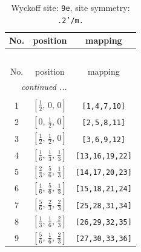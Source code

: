 \documentclass[fleqn,8pt]{jsarticle}
\begin{document}
\begin{longtable}{ccc}
\caption{Wyckoff site: {\tt 9e}, site symmetry: {\tt .2'/m.}}
 \\
 \hline \hline
No. & position & mapping \\ \hline \endfirsthead

\multicolumn{2}{l}{\tablename\ \thetable{}} \\
 \hline \hline
No. & position & mapping \\ \hline \endhead

 \hline \hline
\multicolumn{2}{r}{\footnotesize\it continued ...} \\ \endfoot

 \hline \hline
\multicolumn{2}{r}{} \\ \endlastfoot

1 & $\left[ \frac{1}{2},\, 0,\, 0 \right]$ & {\tt [1,4,7,10]} \\ \hline
2 & $\left[ 0,\, \frac{1}{2},\, 0 \right]$ & {\tt [2,5,8,11]} \\ \hline
3 & $\left[ \frac{1}{2},\, \frac{1}{2},\, 0 \right]$ & {\tt [3,6,9,12]} \\ \hline
4 & $\left[ \frac{1}{6},\, \frac{1}{3},\, \frac{1}{3} \right]$ & {\tt [13,16,19,22]} \\ \hline
5 & $\left[ \frac{2}{3},\, \frac{5}{6},\, \frac{1}{3} \right]$ & {\tt [14,17,20,23]} \\ \hline
6 & $\left[ \frac{1}{6},\, \frac{5}{6},\, \frac{1}{3} \right]$ & {\tt [15,18,21,24]} \\ \hline
7 & $\left[ \frac{5}{6},\, \frac{2}{3},\, \frac{2}{3} \right]$ & {\tt [25,28,31,34]} \\ \hline
8 & $\left[ \frac{1}{3},\, \frac{1}{6},\, \frac{2}{3} \right]$ & {\tt [26,29,32,35]} \\ \hline
9 & $\left[ \frac{5}{6},\, \frac{1}{6},\, \frac{2}{3} \right]$ & {\tt [27,30,33,36]} \\
\end{longtable}
\renewcommand{\arraystretch}{1.2}
\end{document}
